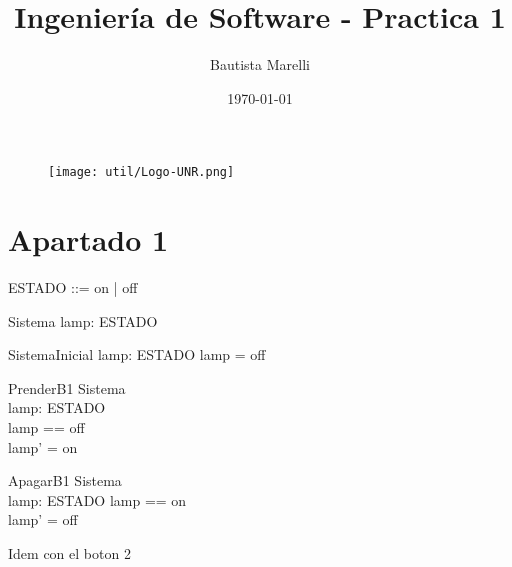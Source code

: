 \documentclass{article}
\begin{document}
\begin{figure}
\centering
\texttt{[image: util/Logo-UNR.png]}
\end{figure}

\title{Ingeniería de Software - Practica 1}
\author{Bautista Marelli}
\date{\today}

\maketitle
\newpage

\section{Apartado 1}
  \begin{zed}
    ESTADO ::= on | off
  \end{zed}
  \begin{schema}{Sistema}
    lamp: ESTADO
  \end{schema}
  \begin{schema}{SistemaInicial}
    lamp: ESTADO
    \where
    lamp = off
  \end{schema}
  \begin{schema}{PrenderB1}
    \Delta Sistema \\
    lamp: ESTADO \\
    \where
    lamp == off \\
    lamp' = on
  \end{schema}
  \begin{schema}{ApagarB1}
    \Delta Sistema \\
    lamp: ESTADO
    \where
    lamp == on \\
    lamp' = off
  \end{schema}
  Idem con el boton 2
\end{document}
